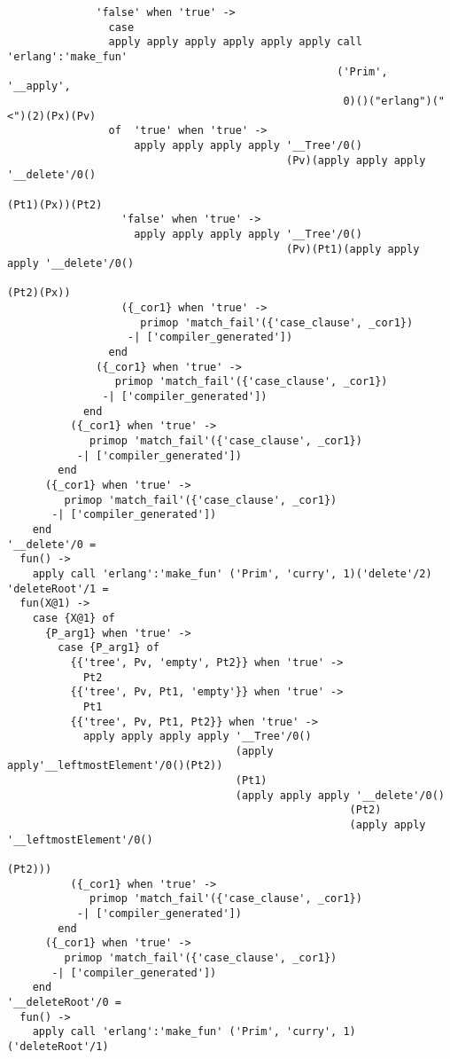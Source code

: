 \begin{lstlisting}
              'false' when 'true' ->
                case
                apply apply apply apply apply apply call 'erlang':'make_fun'
                                                    ('Prim', '__apply',
                                                     0)()("erlang")("<")(2)(Px)(Pv)
                of  'true' when 'true' ->
                    apply apply apply apply '__Tree'/0()
                                            (Pv)(apply apply apply '__delete'/0()
                                                                   (Pt1)(Px))(Pt2)
                  'false' when 'true' ->
                    apply apply apply apply '__Tree'/0()
                                            (Pv)(Pt1)(apply apply apply '__delete'/0()
                                                                        (Pt2)(Px))
                  ({_cor1} when 'true' ->
                     primop 'match_fail'({'case_clause', _cor1})
                   -| ['compiler_generated'])
                end
              ({_cor1} when 'true' ->
                 primop 'match_fail'({'case_clause', _cor1})
               -| ['compiler_generated'])
            end
          ({_cor1} when 'true' ->
             primop 'match_fail'({'case_clause', _cor1})
           -| ['compiler_generated'])
        end
      ({_cor1} when 'true' ->
         primop 'match_fail'({'case_clause', _cor1})
       -| ['compiler_generated'])
    end
'__delete'/0 =
  fun() ->
    apply call 'erlang':'make_fun' ('Prim', 'curry', 1)('delete'/2)
'deleteRoot'/1 =
  fun(X@1) ->
    case {X@1} of
      {P_arg1} when 'true' ->
        case {P_arg1} of
          {{'tree', Pv, 'empty', Pt2}} when 'true' ->
            Pt2
          {{'tree', Pv, Pt1, 'empty'}} when 'true' ->
            Pt1
          {{'tree', Pv, Pt1, Pt2}} when 'true' ->
            apply apply apply apply '__Tree'/0()
                                    (apply apply'__leftmostElement'/0()(Pt2))
                                    (Pt1)
                                    (apply apply apply '__delete'/0()
                                                      (Pt2)
                                                      (apply apply '__leftmostElement'/0()
                                                                   (Pt2)))
          ({_cor1} when 'true' ->
             primop 'match_fail'({'case_clause', _cor1})
           -| ['compiler_generated'])
        end
      ({_cor1} when 'true' ->
         primop 'match_fail'({'case_clause', _cor1})
       -| ['compiler_generated'])
    end
'__deleteRoot'/0 =
  fun() ->
    apply call 'erlang':'make_fun' ('Prim', 'curry', 1)('deleteRoot'/1)

\end{lstlisting}
